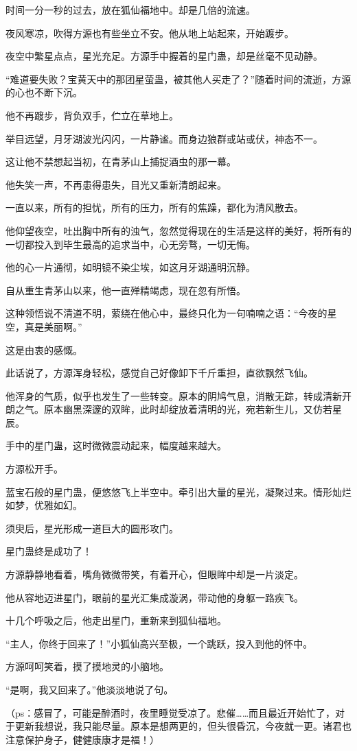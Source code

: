 \begin{this_body}
时间一分一秒的过去，放在狐仙福地中。却是几倍的流速。

夜风寒凉，吹得方源也有些坐立不安。他从地上站起来，开始踱步。

夜空中繁星点点，星光充足。方源手中握着的星门蛊，却是丝毫不见动静。

“难道要失败？宝黄天中的那团星萤蛊，被其他人买走了？”随着时间的流逝，方源的心也不断下沉。

他不再踱步，背负双手，伫立在草地上。

举目远望，月牙湖波光闪闪，一片静谧。而身边狼群或站或伏，神态不一。

这让他不禁想起当初，在青茅山上捕捉酒虫的那一幕。

他失笑一声，不再患得患失，目光又重新清朗起来。

一直以来，所有的担忧，所有的压力，所有的焦躁，都化为清风散去。

他仰望夜空，吐出胸中所有的浊气，忽然觉得现在的生活是这样的美好，将所有的一切都投入到毕生最高的追求当中，心无旁骛，一切无悔。

他的心一片通彻，如明镜不染尘埃，如这月牙湖通明沉静。

自从重生青茅山以来，他一直殚精竭虑，现在忽有所悟。

这种领悟说不清道不明，萦绕在他心中，最终只化为一句喃喃之语：“今夜的星空，真是美丽啊。”

这是由衷的感慨。

此话说了，方源浑身轻松，感觉自己好像卸下千斤重担，直欲飘然飞仙。

他浑身的气质，似乎也发生了一些转变。原本的阴鸠气息，消散无踪，转成清新开朗之气。原本幽黑深邃的双眸，此时却绽放着清明的光，宛若新生儿，又仿若星辰。

手中的星门蛊，这时微微震动起来，幅度越来越大。

方源松开手。

蓝宝石般的星门蛊，便悠悠飞上半空中。牵引出大量的星光，凝聚过来。情形灿烂如梦，优雅如幻。

须臾后，星光形成一道巨大的圆形攻门。

星门蛊终是成功了！

方源静静地看着，嘴角微微带笑，有着开心，但眼眸中却是一片淡定。

他从容地迈进星门，眼前的星光汇集成漩涡，带动他的身躯一路疾飞。

十几个呼吸之后，他走出星门，重新来到狐仙福地。

“主人，你终于回来了！”小狐仙高兴至极，一个跳跃，投入到他的怀中。

方源呵呵笑着，摸了摸地灵的小脑地。

“是啊，我又回来了。”他淡淡地说了句。

（ps：感冒了，可能是醉酒时，夜里睡觉受凉了。悲催……而且最近开始忙了，对于更新我想说，我只能尽量。原本是想两更的，但头很昏沉，今夜就一更。诸君也注意保护身子，健健康康才是福！）

\end{this_body}

